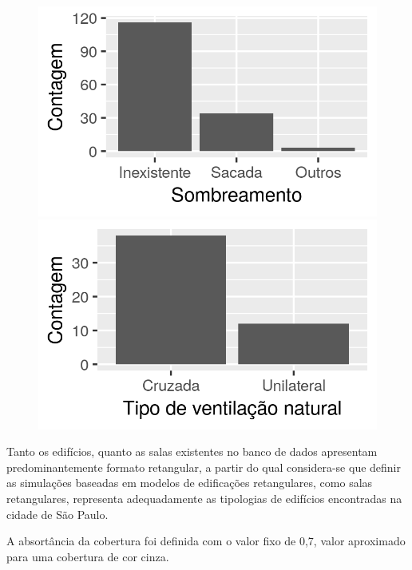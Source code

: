 \documentclass[brazil,hardcopy,openany,a4paper]{ufscthesis}
\begin{document}
\begin{figure}
\begin{minipage}{.5\textwidth}
		\end{minipage}
		\centering	
		\begin{minipage}{.5\textwidth}
			\centering
			\includegraphics[width=\linewidth]{img/hist_sombreamento.png}
		\end{minipage}%
		\begin{minipage}{.5\textwidth}
			\centering
			\includegraphics[width=\linewidth]{img/hist_tipo_vn.png}
		\end{minipage}
	\end{figure}
	
	Tanto os edifícios, quanto as salas existentes no banco de dados apresentam predominantemente formato retangular, a partir do qual considera-se que definir as simulações baseadas em modelos de edificações retangulares, como salas retangulares, representa adequadamente as tipologias de edifícios encontradas na cidade de São Paulo.
	
	A absortância da cobertura foi definida com o valor fixo de 0,7, valor aproximado para uma cobertura de cor cinza.
	
\end{document}
